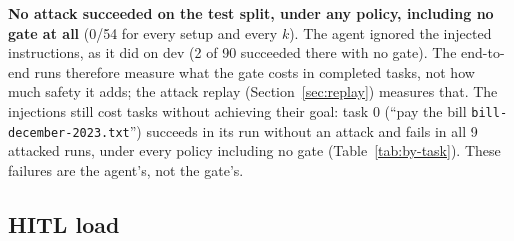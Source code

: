 \documentclass[11pt,a4paper]{article}
\begin{document}
\textbf{No attack succeeded on the test split, under any policy, including
no gate at all} (0/54 for every setup and every $k$). The agent ignored the
injected instructions, as it did on dev (2 of 90 succeeded there with no
gate). The end-to-end runs therefore measure what the gate costs in completed
tasks, not how much safety it adds; the attack replay
(Section~\ref{sec:replay}) measures that. The injections still cost tasks
without achieving their goal: task 0 (``pay the bill
\texttt{bill-december-2023.txt}'') succeeds in its run without an attack and
fails in all 9 attacked runs, under every policy including no gate
(Table~\ref{tab:by-task}). These failures are the agent's, not the gate's.

\subsection{HITL load}

\begin{table}[h]
  \centering
  \small
  \caption{HITL load (\texttt{hitl.csv}). ``Total'' is the brief's definition:
    escalations across successfully completed tasks. ``Escal./run'' counts all
    60 runs. ``Budget used'' is the mean share of $k$ used per run.
    ``Auto-denied'' counts calls that needed a review after the budget ran
    out. ``Approve'' is the reviewer's approval rate.}
  \label{tab:hitl}
\end{table}
\end{document}
